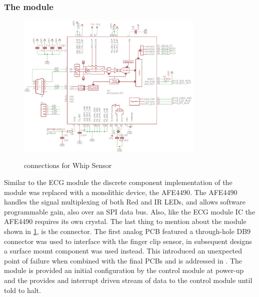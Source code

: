 \subsubsection{The  module}

\begin{figure}
	\begin{center}
		\label{fig:Rev5_SPO2}
		\includegraphics[scale=1,width=0.8\textwidth]{Images/Rev5_SPO2.png} 
		\caption{ connections for Whip Sensor}
	\end{center}
\end{figure}
Similar to the ECG module the discrete component implementation of the  module was replaced with a monolithic device, the AFE4490.\cite{AFE4490} The AFE4490 handles the signal multiplexing of both Red and IR LEDs, and allows software programmable gain, also over an SPI data bus. Also, like the ECG module IC the AFE4490 requires its own crystal. The last thing to mention about the  module shown in \cref{fig:Rev5_SPO2}, is the connector. The first analog PCB featured a through-hole DB9 connector was used to interface with the finger clip sensor, in subsequent designs a surface mount component was used instead. This introduced an unexpected point of failure when combined with the final PCBs and is addressed in . The  module is provided an initial configuration by the control module at power-up and the provides and interrupt driven stream of data to the control module until told to halt.

